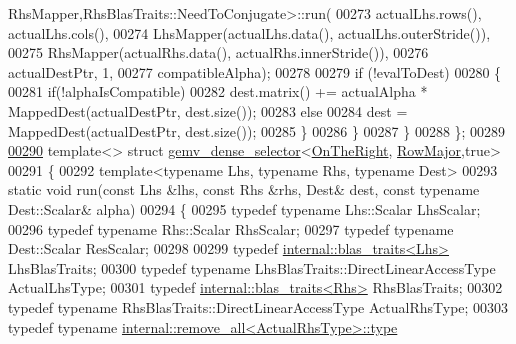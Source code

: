 \begin{DoxyCode}
      RhsMapper,RhsBlasTraits::NeedToConjugate>::run(
00273           actualLhs.rows(), actualLhs.cols(),
00274           LhsMapper(actualLhs.data(), actualLhs.outerStride()),
00275           RhsMapper(actualRhs.data(), actualRhs.innerStride()),
00276           actualDestPtr, 1,
00277           compatibleAlpha);
00278 
00279       \textcolor{keywordflow}{if} (!evalToDest)
00280       \{
00281         \textcolor{keywordflow}{if}(!alphaIsCompatible)
00282           dest.matrix() += actualAlpha * MappedDest(actualDestPtr, dest.size());
00283         \textcolor{keywordflow}{else}
00284           dest = MappedDest(actualDestPtr, dest.size());
00285       \}
00286     \}
00287   \}
00288 \};
00289 
\hyperlink{struct_eigen_1_1internal_1_1gemv__dense__selector_3_01_on_the_right_00_01_row_major_00_01true_01_4}{00290} \textcolor{keyword}{template}<> \textcolor{keyword}{struct }\hyperlink{struct_eigen_1_1internal_1_1gemv__dense__selector}{gemv\_dense\_selector}<\hyperlink{group__enums_ggac22de43beeac7a78b384f99bed5cee0ba99dc75d8e00b6c3a5bdc31940f47492b}{OnTheRight},
      \hyperlink{group__enums_ggaacded1a18ae58b0f554751f6cdf9eb13acfcde9cd8677c5f7caf6bd603666aae3}{RowMajor},true>
00291 \{
00292   \textcolor{keyword}{template}<\textcolor{keyword}{typename} Lhs, \textcolor{keyword}{typename} Rhs, \textcolor{keyword}{typename} Dest>
00293   \textcolor{keyword}{static} \textcolor{keywordtype}{void} run(\textcolor{keyword}{const} Lhs &lhs, \textcolor{keyword}{const} Rhs &rhs, Dest& dest, \textcolor{keyword}{const} \textcolor{keyword}{typename} Dest::Scalar& alpha)
00294   \{
00295     \textcolor{keyword}{typedef} \textcolor{keyword}{typename} Lhs::Scalar   LhsScalar;
00296     \textcolor{keyword}{typedef} \textcolor{keyword}{typename} Rhs::Scalar   RhsScalar;
00297     \textcolor{keyword}{typedef} \textcolor{keyword}{typename} Dest::Scalar  ResScalar;
00298     
00299     \textcolor{keyword}{typedef} \hyperlink{struct_eigen_1_1internal_1_1blas__traits}{internal::blas\_traits<Lhs>} LhsBlasTraits;
00300     \textcolor{keyword}{typedef} \textcolor{keyword}{typename} LhsBlasTraits::DirectLinearAccessType ActualLhsType;
00301     \textcolor{keyword}{typedef} \hyperlink{struct_eigen_1_1internal_1_1blas__traits}{internal::blas\_traits<Rhs>} RhsBlasTraits;
00302     \textcolor{keyword}{typedef} \textcolor{keyword}{typename} RhsBlasTraits::DirectLinearAccessType ActualRhsType;
00303     \textcolor{keyword}{typedef} \textcolor{keyword}{typename} \hyperlink{group___sparse_core___module}{internal::remove\_all<ActualRhsType>::type} 

\end{DoxyCode}
